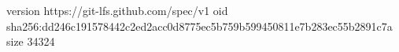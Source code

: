 version https://git-lfs.github.com/spec/v1
oid sha256:dd246c191578442c2ed2acc0d8775ec5b759b599450811e7b283ec55b2891c7a
size 34324
